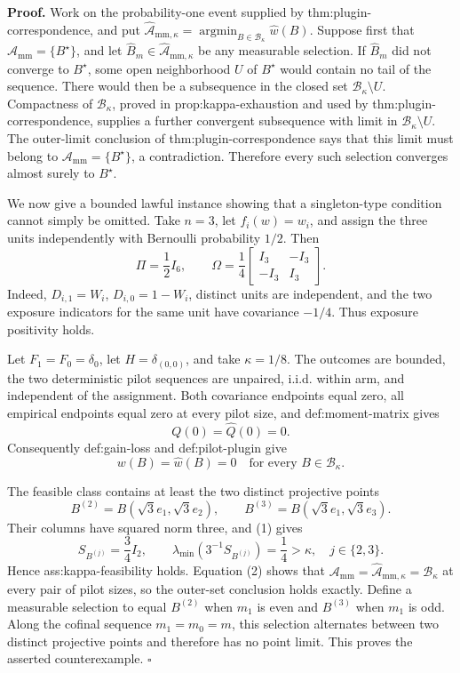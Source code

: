 \textbf{Proof.}
Work on the probability-one event supplied by thm:plugin-correspondence, and put \(\widehat{\mathcal A}_{\mathrm{mm},\kappa}=\operatorname*{argmin}_{B\in\mathcal B_\kappa}\widehat w(B)\).  Suppose first that \(\mathcal A_{\mathrm{mm}}=\{B^\star\}\), and let \(\widehat B_m\in\widehat{\mathcal A}_{\mathrm{mm},\kappa}\) be any measurable selection.  If \(\widehat B_m\) did not converge to \(B^\star\), some open neighborhood \(U\) of \(B^\star\) would contain no tail of the sequence.  There would then be a subsequence in the closed set \(\mathcal B_\kappa\setminus U\).  Compactness of \(\mathcal B_\kappa\), proved in prop:kappa-exhaustion and used by thm:plugin-correspondence, supplies a further convergent subsequence with limit in \(\mathcal B_\kappa\setminus U\).  The outer-limit conclusion of thm:plugin-correspondence says that this limit must belong to \(\mathcal A_{\mathrm{mm}}=\{B^\star\}\), a contradiction.  Therefore every such selection converges almost surely to \(B^\star\).

We now give a bounded lawful instance showing that a singleton-type condition cannot simply be omitted.  Take \(n=3\), let \(f_i(w)=w_i\), and assign the three units independently with Bernoulli probability \(1/2\).  Then
\[
 \Pi=\frac12I_6,
 \qquad
 \Omega=\frac14
 \begin{bmatrix}
 I_3&-I_3\\
 -I_3&I_3
 \end{bmatrix}.
 \tag{1}
\]
Indeed, \(D_{i,1}=W_i\), \(D_{i,0}=1-W_i\), distinct units are independent, and the two exposure indicators for the same unit have covariance \(-1/4\).  Thus exposure positivity holds.

Let \(F_1=F_0=\delta_0\), let \(H=\delta_{(0,0)}\), and take \(\kappa=1/8\).  The outcomes are bounded, the two deterministic pilot sequences are unpaired, i.i.d. within arm, and independent of the assignment.  Both covariance endpoints equal zero, all empirical endpoints equal zero at every pilot size, and def:moment-matrix gives
\[
 Q(0)=\widehat Q(0)=0.
\]
Consequently def:gain-loss and def:pilot-plugin give
\[
 w(B)=\widehat w(B)=0
 \quad\text{for every }B\in\mathcal B_\kappa.
 \tag{2}
\]

The feasible class contains at least the two distinct projective points
\[
 B^{(2)}=B(\sqrt3e_1,\sqrt3e_2),
 \qquad
 B^{(3)}=B(\sqrt3e_1,\sqrt3e_3).
\]
Their columns have squared norm three, and (1) gives
\[
 S_{B^{(j)}}=\frac34I_2,
 \qquad
 \lambda_{\min}\!\left(3^{-1}S_{B^{(j)}}\right)=\frac14>\kappa,
 \quad j\in\{2,3\}.
 \tag{3}
\]
Hence ass:kappa-feasibility holds.  Equation (2) shows that
\(\mathcal A_{\mathrm{mm}}=\widehat{\mathcal A}_{\mathrm{mm},\kappa}=\mathcal B_\kappa\) at every pair of pilot sizes, so the outer-set conclusion holds exactly.  Define a measurable selection to equal \(B^{(2)}\) when \(m_1\) is even and \(B^{(3)}\) when \(m_1\) is odd.  Along the cofinal sequence \(m_1=m_0=m\), this selection alternates between two distinct projective points and therefore has no point limit.  This proves the asserted counterexample. \(\square\)